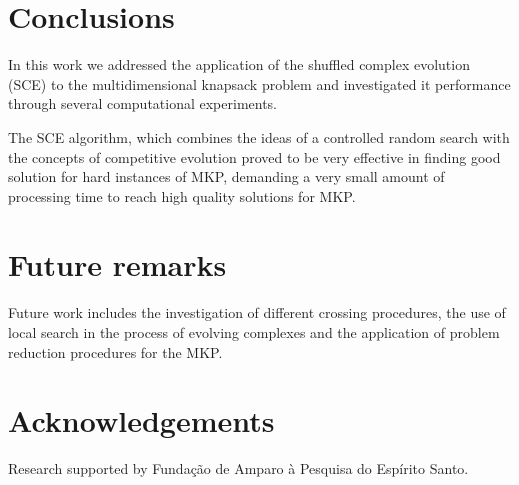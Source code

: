 \documentclass[a0,portrait]{a0poster}
\begin{document}
\begin{multicols}{2}
\color{SaddleBrown} %

\section*{Conclusions}

In this work we addressed the application of the shuffled complex
evolution (SCE) to the multidimensional knapsack problem and investigated it
performance through several computational experiments.

The SCE algorithm, which combines the ideas of a controlled random search with
the concepts of competitive evolution proved to be very effective in finding
good solution for hard instances of MKP, demanding a very small amount of
processing time to reach high quality solutions for MKP.

\color{DarkSlateGray} %


\section*{Future remarks}

Future work includes the investigation of different crossing procedures,
the use of local search in the process of evolving complexes and the
application of problem reduction procedures for the MKP.




\section*{Acknowledgements}
Research supported by Funda\c c\~ao de Amparo \`a Pesquisa do Esp\'irito Santo.

\end{multicols}
\end{document}
